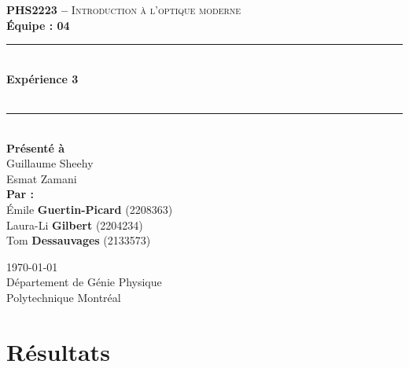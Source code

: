 \documentclass[11pt,letterpaper]{article}
\begin{document}
\begin{titlepage}
\center

\begin{figure}
\end{figure}
\vspace*{2 cm}

\textsc{\Large \textbf{PHS2223 --} Introduction à l'optique moderne}\\[0.5cm]
\large{\textbf{Équipe : 04}}\\[1.5cm]

\rule{\linewidth}{0.5mm} \\[0.5cm]
\Large{\textbf{Expérience 3}} \\[0.2cm]
\\
\rule{\linewidth}{0.2mm} \\[2.3cm]

\large{\textbf{Présenté à}\\
  Guillaume Sheehy\\
  Esmat Zamani\\[2.5cm]
  \textbf{Par :}\\
  Émile \textbf{Guertin-Picard} (2208363)\\
  Laura-Li \textbf{Gilbert} (2204234)\\
  Tom \textbf{Dessauvages} (2133573)\\[3cm]}

\large{\today\\
Département de Génie Physique\\
Polytechnique Montréal\\}

\end{titlepage}


\tableofcontents
{}
\newpage

\pagestyle{fancy}
\setlength{\headheight}{14pt}
\renewcommand{\headrulewidth}{0pt}
\fancyfoot[R]{\thepage}

\pagestyle{fancy}
\fancyhf{}
\renewcommand{\headrulewidth}{1pt}
\fancyhead[R]{\today}
\fancyfoot[R]{\thepage}

\setcounter{page}{1}


\section{Résultats}\label{res}
\end{document}
